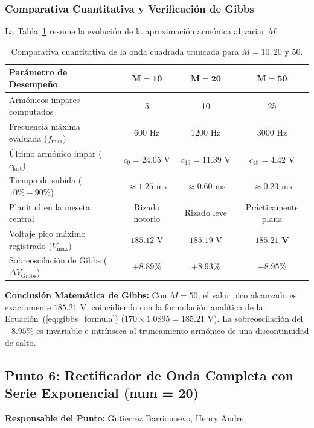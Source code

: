 \documentclass[11pt,a4paper]{article}
\begin{document}
\subsubsection{Comparativa Cuantitativa y Verificación de Gibbs}
La Tabla~\ref{tab:comp_gibbs} resume la evolución de la aproximación armónica al variar $M$.

\begin{table}[H]
\centering
\caption{Comparativa cuantitativa de la onda cuadrada truncada para $M = 10, 20 \text{ y } 50$.}
\label{tab:comp_gibbs}
\begin{tabular}{lccc}
\toprule
\textbf{Parámetro de Desempeño} & $\mathbf{M = 10}$ & $\mathbf{M = 20}$ & $\mathbf{M = 50}$ \\
\midrule
Armónicos impares computados & 5 & 10 & 25 \\
Frecuencia máxima evaluada ($f_{\max}$) & $600\text{ Hz}$ & $1200\text{ Hz}$ & $3000\text{ Hz}$ \\
Último armónico impar ($c_{\text{last}}$) & $c_9 = 24.05\text{ V}$ & $c_{19} = 11.39\text{ V}$ & $c_{49} = 4.42\text{ V}$ \\
Tiempo de subida ($10\% - 90\%$) & $\approx 1.25\text{ ms}$ & $\approx 0.60\text{ ms}$ & $\approx 0.23\text{ ms}$ \\
Planitud en la meseta central & Rizado notorio & Rizado leve & Prácticamente plana \\
Voltaje pico máximo registrado ($V_{\max}$) & $185.12\text{ V}$ & $185.19\text{ V}$ & $\mathbf{185.21\text{ V}}$ \\
Sobreoscilación de Gibbs ($\Delta V_{\text{Gibbs}}$) & $+8.89\%$ & $+8.93\%$ & $\mathbf{+8.95\%}$ \\
\bottomrule
\end{tabular}
\end{table}

\noindent\textbf{Conclusión Matemática de Gibbs:} Con $M = 50$, el valor pico alcanzado es exactamente $185.21\text{ V}$, coincidiendo con la formulación analítica de la Ecuación~(\ref{eq:gibbs_formula}) ($170 \times 1.0895 = 185.21\text{ V}$). La sobreoscilación del $+8.95\%$ es invariable e intrínseca al truncamiento armónico de una discontinuidad de salto.

\subsection{Punto 6: Rectificador de Onda Completa con Serie Exponencial (num = 20)}
\textbf{Responsable del Punto:} Gutierrez Barrionuevo, Henry Andre.
\end{document}
